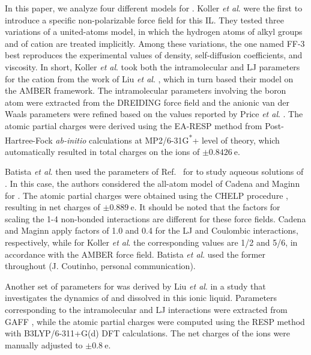 \documentclass[3p,twocolumn]{elsarticle}
\begin{document}
In this paper, we analyze four different models for \ce{[emim][B(CN)_4]}.
Koller \textit{et al}. \cite{Koller_2012} were the first to introduce a specific non-polarizable force field for this IL.
They tested three variations of a united-atoms model, in which the hydrogen atoms of alkyl groups  and  of cation \ce{[emim]^+} are treated implicitly.
Among these variations, the one named FF-3 best reproduces the experimental values of density, self-diffusion coefficients, and viscosity.
In short, Koller \textit{et al}. \cite{Koller_2012} took both the intramolecular and LJ parameters for the cation from the work of Liu \textit{et al}. \cite{Liu_2006}, which in turn based their model on the AMBER \cite{Cornell_1995} framework.
The intramolecular parameters involving the boron atom were extracted from the DREIDING \cite{Mayo_1990} force field and the anionic van der Waals parameters were refined based on the values reported by Price \textit{et al}. \cite{Price_2001}.
The atomic partial charges were derived using the EA-RESP method \cite{Basma_2001} from Post-Hartree-Fock \textit{ab-initio} calculations at MP2/6-31G\textsuperscript{*}+ level of theory, which automatically resulted in total charges on the ions of $\pm0.8426~\mathrm{e}$.

Batista \textit{et al}. \cite{Batista_2015} then used the parameters of Ref.~ for \ce{[B(CN)_4]^-} to study aqueous solutions of \ce{[emim][B(CN)_4]}.
In this case, the authors considered the all-atom model of Cadena and Maginn \cite{Cadena_2006} for \ce{[emim]^+}.
The atomic partial charges were obtained using the CHELP procedure \cite{Breneman_1990}, resulting in net charges of $\pm 0.889~\mathrm{e}$.
It should be noted that the factors for scaling the 1-4 non-bonded interactions are different for these force fields.
Cadena and Maginn \cite{Cadena_2006} apply factors of 1.0 and 0.4 for the LJ and Coulombic interactions, respectively, while for Koller \textit{et al}. \cite{Koller_2012} the corresponding values are 1/2 and 5/6, in accordance with the AMBER force field.
Batista \textit{et al}. \cite{Batista_2015} used the former throughout (J. Coutinho, personal communication).

Another set of parameters for \ce{[emim][B(CN)_4]} was derived by Liu \textit{et al}. \cite{Liu_2014} in a study that investigates the dynamics of  and  dissolved in this ionic liquid.
Parameters corresponding to the intramolecular and LJ interactions were extracted from GAFF \cite{Wang_2004}, while the atomic partial charges were computed using the RESP method \cite{Bayly_1993} with B3LYP/6-311+G(d) DFT calculations.
The net charges of the ions were manually adjusted to $\pm 0.8 ~\mathrm{e}$.
\end{document}
